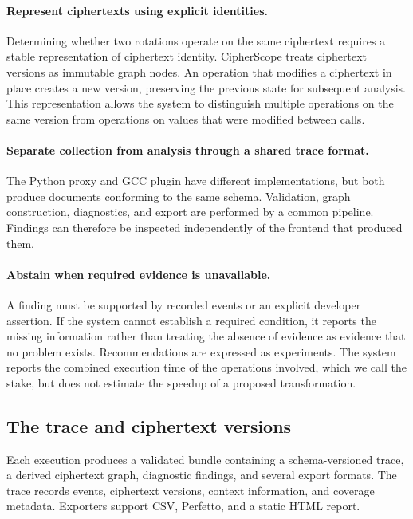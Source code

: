 \documentclass[pdflatex,sn-basic,Numbered,iicol]{sn-jnl}
\begin{document}
\paragraph{Represent ciphertexts using explicit identities.} Determining
whether two rotations operate on the same ciphertext requires a stable
representation of ciphertext identity. CipherScope treats ciphertext versions
as immutable graph nodes. An operation that modifies a ciphertext in place
creates a new version, preserving the previous state for subsequent analysis.
This representation allows the system to distinguish multiple operations on
the same version from operations on values that were modified between calls.

\paragraph{Separate collection from analysis through a shared trace format.}
The Python proxy and GCC plugin have different implementations, but both
produce documents conforming to the same schema. Validation, graph
construction, diagnostics, and export are performed by a common pipeline.
Findings can therefore be inspected independently of the frontend that
produced them.

\paragraph{Abstain when required evidence is unavailable.} A finding must be
supported by recorded events or an explicit developer assertion. If the
system cannot establish a required condition, it reports the missing
information rather than treating the absence of evidence as evidence that no
problem exists. Recommendations are expressed as experiments. The system
reports the combined execution time of the operations involved, which we call
the stake, but does not estimate the speedup of a proposed transformation.

\subsection{The trace and ciphertext versions}
\label{sec:trace}

Each execution produces a validated bundle containing a schema-versioned
trace, a derived ciphertext graph, diagnostic findings, and several export
formats. The trace records events, ciphertext versions, context information,
and coverage metadata. Exporters support CSV, Perfetto, and a static HTML
report.
\end{document}
